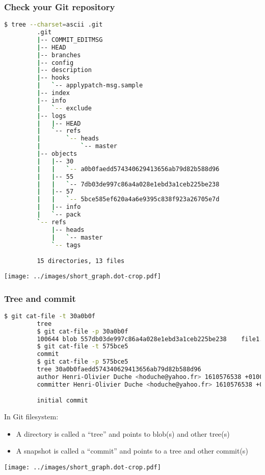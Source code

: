 \begin{frame}[fragile]\frametitle{Check your Git repository}
   \begin{minipage}{0.68\linewidth}
      \begin{lstlisting}[language=bash, style=bash, autogobble]
         $ tree --charset=ascii .git
         .git
         |-- COMMIT_EDITMSG
         |-- HEAD
         |-- branches
         |-- config
         |-- description
         |-- hooks
         |   `-- applypatch-msg.sample
         |-- index
         |-- info
         |   `-- exclude
         |-- logs
         |   |-- HEAD
         |   `-- refs
         |       `-- heads
         |           `-- master
         |-- objects
         |   |-- 30
         |   |   `-- a0b0faedd574340629413656ab79d82b588d96
         |   |-- 55
         |   |   `-- 7db03de997c86a4a028e1ebd3a1ceb225be238
         |   |-- 57
         |   |   `-- 5bce585ef620a4a6e9395c838f923a26705e7d
         |   |-- info
         |   `-- pack
         `-- refs
             |-- heads
             |   `-- master
             `-- tags

         15 directories, 13 files
      \end{lstlisting}
   \end{minipage}
   \begin{minipage}{0.28\linewidth}
      \centering
      \texttt{[image: ../images/short\_graph.dot-crop.pdf]}
   \end{minipage}
\end{frame}

\begin{frame}[fragile]\frametitle{Tree and commit}
   \begin{minipage}{0.68\linewidth}
      \begin{lstlisting}[language=bash, style=bash, autogobble]
         $ git cat-file -t 30a0b0f
         tree
         $ git cat-file -p 30a0b0f
         100644 blob 557db03de997c86a4a028e1ebd3a1ceb225be238    file1.txt
         $ git cat-file -t 575bce5
         commit
         $ git cat-file -p 575bce5
         tree 30a0b0faedd574340629413656ab79d82b588d96
         author Henri-Olivier Duche <hoduche@yahoo.fr> 1610576538 +0100
         committer Henri-Olivier Duche <hoduche@yahoo.fr> 1610576538 +0100

         initial commit
      \end{lstlisting}
      \vspace{1em}
      In Git filesystem:
      \begin{itemize}
         \item A directory is called a ``tree'' and points to blob(s) and other tree(s)
         \item A snapshot is called a ``commit'' and points to a tree and other commit(s)
      \end{itemize}
   \end{minipage}
   \begin{minipage}{0.28\linewidth}
      \centering
      \texttt{[image: ../images/short\_graph.dot-crop.pdf]}
   \end{minipage}
\end{frame}

